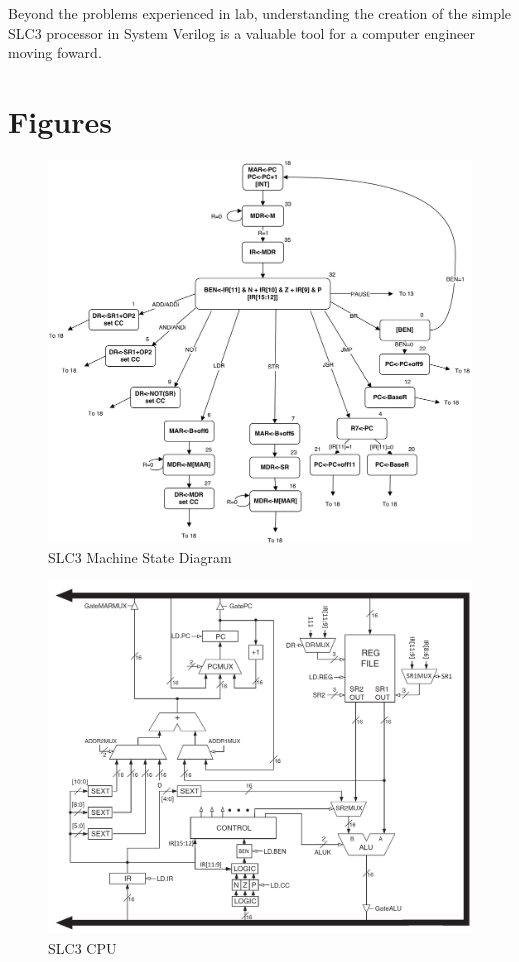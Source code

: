 \documentclass[journal, twocolumn, final,11pt,letterpaper]{IEEEtran}
\begin{document}
Beyond the problems experienced in lab, understanding the creation of the simple SLC3 processor in System Verilog is a valuable tool for a computer engineer moving foward.   \\      



\clearpage
\onecolumn
\section{Figures}

\begin{figure} [htbp]
	\centering	
	\includegraphics[scale=0.7]{state-diagram.png}
	\caption{SLC3 Machine State Diagram	\label{fig:state-diagram}}
\end{figure}


\begin{figure} [htbp]
	\centering
	\includegraphics[scale=0.27]{SLC3_Circuit.png}
	\caption{SLC3 CPU \label{fig:SLC3-Circuit}}
\end{figure}
\end{document}
